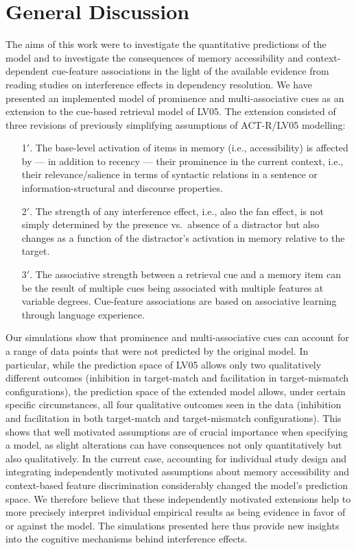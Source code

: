 \documentclass{cambridge7A}\usepackage[]{graphicx}\usepackage[]{color}
\begin{document}
\section{General Discussion}
The aims of this work were to investigate the quantitative predictions of the \cite{LewisVasishth2005} model and to investigate the consequences of memory accessibility and context-dependent cue-feature associations in the light of the available evidence from reading studies on interference effects in dependency resolution.
We have presented an implemented model of prominence and multi-associative cues as an extension to the cue-based retrieval model of LV05. 
The extension consisted of three revisions of previously simplifying assumptions of ACT-R/LV05 modelling:

\begin{enumerate}
  \item[1$'$.] The base-level activation of items in memory (i.e., accessibility) is affected by --- in addition to recency --- their prominence in the current context, i.e., their  relevance/salience in terms of syntactic relations in a sentence or information-structural and discourse properties.
  \item[2$'$.] The strength of any interference effect, i.e., also the fan effect, is not simply determined by the presence vs.\ absence of a distractor but also changes as a function of the distractor's activation in memory relative to the target.
  \item[3$'$.] The associative strength between a retrieval cue and a memory item can be the result of multiple cues being associated with multiple features at variable degrees. Cue-feature associations are based on associative learning through language experience. 
\end{enumerate}

Our simulations show that prominence and multi-associative cues can account for a range of data points that were not predicted by the original model. 
In particular, while the prediction space of LV05 allows only two qualitatively different outcomes (inhibition in
target-match and facilitation in 
 target-mismatch configurations), the prediction space of the extended model allows, under certain specific circumstances, all four qualitative outcomes seen in the data (inhibition and facilitation in both target-match and target-mismatch configurations). 
This shows that well motivated assumptions are of crucial importance when specifying a model, as slight alterations can have consequences not only quantitatively but also qualitatively.
In the current case, accounting for individual study design and integrating independently motivated assumptions about memory accessibility and context-based feature discrimination considerably changed the model's prediction space.
We therefore believe that these independently motivated extensions help to more precisely interpret individual empirical results as being evidence in favor of or against the model. The simulations presented here thus provide new insights into the cognitive mechanisms behind interference effects.
\end{document}
